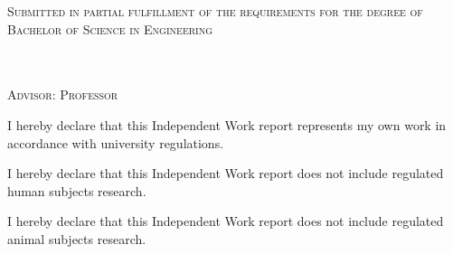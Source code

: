 \begin{titlepage}
\centering
\vspace*{1.5in}
{\LARGE \textsc{\reporttitle} \par}
\vspace{0.3in}
{\large \textsc{\reportsubtitle} \par}
\vspace{0.8in}
{\Large \textsc{\reportauthor} \par}
\vspace{0.8in}
{\normalsize \textsc{Submitted in partial fulfillment of the requirements for the degree of} \\[6pt]
\textsc{Bachelor of Science in Engineering} \par}
\vspace{0.8in}
{\normalsize \textsc{\reportdept} \\[4pt]
\textsc{\reportuni} \\[4pt]
\textsc{Advisor: Professor \reportadviser} \par}
\vspace{0.8in}
{\normalsize \textsc{\reportdate} \par}
\end{titlepage}

\newpage
\thispagestyle{empty}
\vspace*{2in}

I hereby declare that this Independent Work report represents my own work in accordance with university regulations.

\vspace{0.6in}

I hereby declare that this Independent Work report does not include regulated human subjects research.

\vspace{0.6in}

I hereby declare that this Independent Work report does not include regulated animal subjects research.

\vspace{1.5in}
\hfill \reportauthor
\newpage

